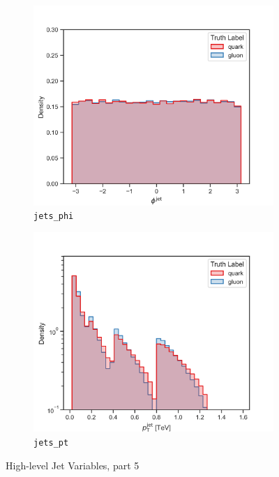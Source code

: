 \begin{figure}[!htb]
\begin{subfigure}[t]{0.49\textwidth}
	\end{subfigure}
	\begin{subfigure}[t]{0.49\textwidth}
		\includegraphics[width=1\textwidth]{src/plots/distributions/highlevel/jets_phi.png}
		\caption{\texttt{jets\_phi}}
		\label{fig:highlevel_28}
	\end{subfigure}
	\begin{subfigure}[t]{0.49\textwidth}
		\includegraphics[width=1\textwidth]{src/plots/distributions/highlevel/jets_pt.png}
		\caption{\texttt{jets\_pt}}
		\label{fig:highlevel_29}
	\end{subfigure}
\caption{High-level Jet Variables, part 5}
\label{fig:highlevel_24-29}
\end{figure}

